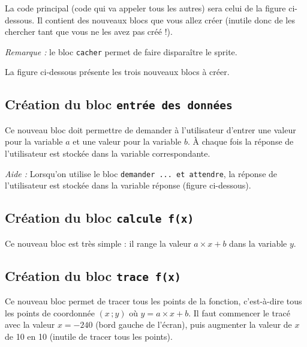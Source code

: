 La code principal (code qui va appeler tous les autres) sera celui de la figure ci-dessous. Il contient des nouveaux blocs que vous allez créer (inutile donc de les chercher tant que vous ne les avez pas créé !).


\emph{Remarque :} le bloc \texttt{cacher} permet de faire disparaître le sprite.

\vspace{6pt}

La figure ci-dessous présente les trois nouveaux blocs à créer.




\subsection{Création du bloc \texttt{entrée des données}}


Ce nouveau bloc doit permettre de demander à l'utilisateur d'entrer une valeur pour la variable $a$ et une valeur pour la variable $b$. À chaque fois la réponse de l'utilisateur est stockée dans la variable correspondante.

\vspace{6pt}

\emph{Aide :} Lorsqu'on utilise le bloc \texttt{demander ... et attendre}, la réponse de l'utilisateur est stockée dans la variable réponse (figure ci-dessous).





\subsection{Création du bloc \texttt{calcule f(x)}}


Ce nouveau bloc est très simple : il range la valeur $a \times x + b$ dans la variable $y$.




\subsection{Création du bloc \texttt{trace f(x)}}


Ce nouveau bloc permet de tracer tous les points de la fonction, c'est-à-dire tous les points de coordonnée $(x\,;y)$ où $y=a\times x + b$. Il faut commencer le tracé avec la valeur $x=-240$ (bord gauche de l'écran), puis augmenter la valeur de $x$ de 10 en 10 (inutile de tracer tous les points).







